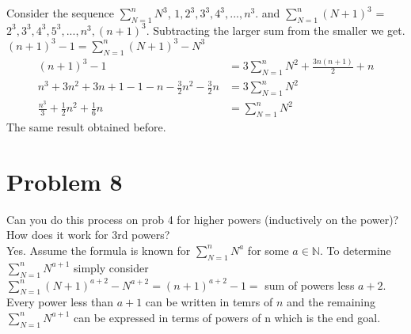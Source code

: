 \documentclass{article}
\begin{document}
    Consider the sequence $\sum_{N=1}^{n}N^{3}$, $1,2^{3}, 3^{3}, 4^{3},...,n^{3}$. and
    $\sum_{N=1}^{n}(N+1)^{3}$ = $2^{3},3^{3},4^{3},5^{3},...,n^{3},(n+1)^{3}$. Subtracting the larger sum from the smaller we get.\\
    $(n+1)^{3}-1 = \sum_{N=1}^{n}(N+1)^{3}-N^{3}$ \\
    \begin{align*}
        (n+1)^{3}-1 &= 3\sum_{N=1}^{n}N^2 + \frac{3n(n+1)}{2} + n\\
        n^{3}+3n^2+3n+1-1-n-\frac{3}{2}n^2-\frac{3}{2}n&=3\sum_{N=1}^{n}N^2\\
        \frac{n^{3}}{3}+\frac{1}{2}n^2+\frac{1}{6}n&=\sum_{N=1}^{n}N^2
    \end{align*}
    The same result obtained before.


    \section{Problem 8}
    Can you do this process on prob 4 for higher powers (inductively on the power)? How does it work for 3rd powers?\\
    Yes.
    Assume the formula is known for $\sum_{N=1}^{n}N^{a}$ for some $a \in \mathbb{N}$. To determine $ \sum_{N=1}^{n}N^{a+1}$ simply
    consider $\sum_{N=1}^{n}(N+1)^{a+2}-N^{a+2} = (n+1)^{a+2}-1 =$ sum of powers less $a+2$. Every power less than $a+1$ can be written in temrs of $n$
    and the remaining $\sum_{N=1}^{n}N^{a+1}$ can be expressed in terms of powers of n which is the end goal.
\end{document}
